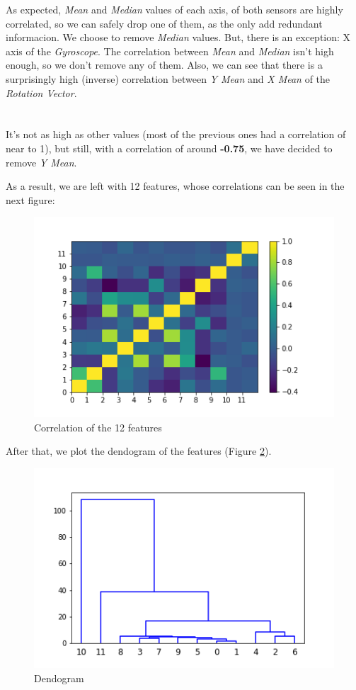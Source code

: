 \documentclass[idxtotoc,hyperref,openany]{labbook} %
\begin{document}
As expected, \textit{Mean} and \textit{Median} values of each axis, of both sensors are highly correlated, so we can safely drop one of them, as the only add redundant informacion. We choose to remove \textit{Median} values. But, there is an exception: X axis of the \textit{Gyroscope}. The correlation between \textit{Mean} and \textit{Median} isn't high enough, so we don't remove any of them.
Also, we can see that there is a surprisingly high (inverse) correlation between \textit{Y Mean} and \textit{X Mean} of the \textit{Rotation Vector}.\\\\\\
It's not as high as other values (most of the previous ones had a correlation of near to 1), but still, with a correlation of around \textbf{-0.75}, we have decided to remove \textit{Y Mean}.

As a result, we are left with 12 features, whose correlations can be seen in the next figure:

\begin{figure}[h]
\includegraphics[width=0.9\linewidth]{2710/Features_CorrelationMatrix_postDrop.png}
\setlength\belowcaptionskip{-10pt}
\caption{Correlation of the 12 features}
\label{Correlation Postdrop Gyroscope}
\end{figure}

After that, we plot the dendogram of the features (Figure \ref{Dendogram Gyroscope}).

\begin{figure}[h]
\includegraphics[width=0.9\linewidth]{2710/Features_Dendogram.png}
\setlength\belowcaptionskip{-10pt}
\caption{Dendogram}
\label{Dendogram Gyroscope}
\end{figure}
\end{document}
